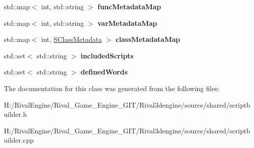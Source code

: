 \begin{DoxyCompactItemize}
\mbox{\label{class_c_script_builder_a158cd8f9e126a39e3de4181b79df9555}} 
std\+::map$<$ int, std\+::string $>$ {\bfseries func\+Metadata\+Map}
\item 
\mbox{\label{class_c_script_builder_a7123672fa8a5393d150ca4ad475a95bd}} 
std\+::map$<$ int, std\+::string $>$ {\bfseries var\+Metadata\+Map}
\item 
\mbox{\label{class_c_script_builder_a517e69cbc011e431a6b6a91997cc5d47}} 
std\+::map$<$ int, \hyperlink{struct_c_script_builder_1_1_s_class_metadata}{S\+Class\+Metadata} $>$ {\bfseries class\+Metadata\+Map}
\item 
\mbox{\label{class_c_script_builder_aafe2cb8509a4cfb96d2e58b352fa0b8b}} 
std\+::set$<$ std\+::string $>$ {\bfseries included\+Scripts}
\item 
\mbox{\label{class_c_script_builder_a83c116cb8287d6637741857b9e44e18a}} 
std\+::set$<$ std\+::string $>$ {\bfseries defined\+Words}
\end{DoxyCompactItemize}


The documentation for this class was generated from the following files\+:\begin{DoxyCompactItemize}
\item 
H\+:/\+Rival\+Engine/\+Rival\+\_\+\+Game\+\_\+\+Engine\+\_\+\+G\+I\+T/\+Rival3dengine/source/shared/scriptbuilder.\+h\item 
H\+:/\+Rival\+Engine/\+Rival\+\_\+\+Game\+\_\+\+Engine\+\_\+\+G\+I\+T/\+Rival3dengine/source/shared/scriptbuilder.\+cpp\end{DoxyCompactItemize}
